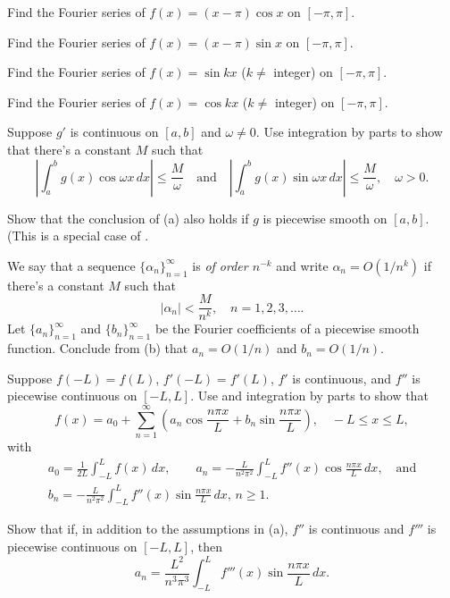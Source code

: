 \begin{exerciselist}
\item\label{exer:11.2.21}Find the Fourier series of $f(x)=(x-\pi)\cos x$ on $[-\pi,\pi]$.

\item\label{exer:11.2.22}Find the Fourier series of $f(x)=(x-\pi)\sin x$ on $[-\pi,\pi]$.

\item\label{exer:11.2.23}Find the Fourier series  of $f(x)=\sin kx$ ($k\ne$
integer) on $[-\pi,\pi]$.

\item\label{exer:11.2.24}Find the Fourier series  of $f(x)=\cos kx$ ($k\ne$
integer) on $[-\pi,\pi]$.

\item\label{exer:11.2.25}\begin{alist}
\item %
Suppose $g'$ is continuous on $[a,b]$ and $\omega\ne0$.
Use integration by parts to show that there's a constant $M$ such
that
\[
\left|\int_a^bg(x)\cos\omega x\,dx\right|\le\frac{M}{\omega}
\quad\text{and}\quad
\left|\int_a^bg(x)\sin\omega x\,dx\right|\le\frac{M}{\omega},\quad
\omega>0.
\]
\item %
Show that the conclusion of (a) also holds if $g$
is piecewise smooth on $[a,b]$.  (This is a special case
of
.
\item %
We say that a sequence $\{\alpha_n\}_{n=1}^\infty$  is \emph{\color{blue}of
order $n^{-k}$} and write
$\alpha_n=O(1/n^k)$
if  there's a constant $M$ such that
\[
|\alpha_n|<\frac{M}{n^k},\quad n=1,2,3,\dots.
\]
Let $\{a_n\}_{n=1}^\infty$ and $\{b_n\}_{n=1}^\infty$
be the Fourier coefficients of a piecewise smooth function.
Conclude from (b) that $a_n=O(1/n)$  and $b_n=O(1/n)$.
\end{alist}

\item\label{exer:11.2.26}\begin{alist}
\item %
Suppose $f(-L)=f(L)$, $f'(-L)=f'(L)$,  $f'$ is continuous,
and $f''$ is piecewise continuous
on $[-L,L]$.
Use  and integration by parts to show that
\[
f(x)=a_0+\sum_{n=1}^\infty\left(a_n\cos\frac{n\pi x}{L}+b_n\sin\frac{n\pi
x}{L}\right),\quad -L\le x\le L,
\]
with
\begin{gather*}
a_0=\frac{1}{2L}\int_{-L}^L f(x)\,dx,
\qquad
a_n= -\frac{L}{n^2\pi^2}\int_{-L}^L f''(x)\cos\frac{n\pi x}{L}\,dx,
\quad\text{and}\\
b_n=-\frac{L}{n^2\pi^2}\int_{-L}^L f''(x)\sin\frac{n\pi x}{L}\,dx,\,n\ge1.
\end{gather*}
\item %
Show that if, in addition to the  assumptions in (a),  $f''$ is
continuous and $f'''$ is piecewise continuous on
$[-L,L]$, then
\[
a_n=\frac{L^2}{n^3\pi^3}\int_{-L}^Lf'''(x)\sin\frac{n\pi x}{L}\,dx.
\]
\end{alist}


\end{exerciselist}
